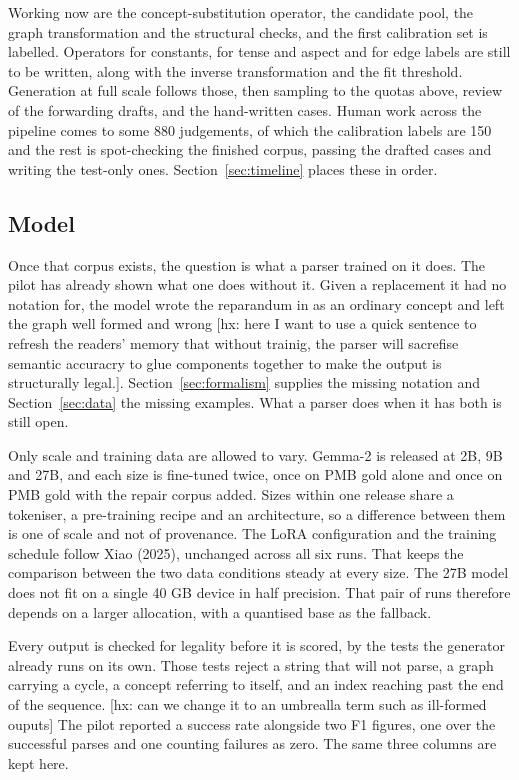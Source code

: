 \documentclass{article}
\begin{document}
Working now are the concept-substitution operator, the candidate pool, the graph
transformation and the structural checks, and the first calibration set is
labelled. Operators for constants, for tense and aspect and for edge labels are
still to be written, along with the inverse transformation and the fit threshold.
Generation at full scale follows those, then sampling to the quotas above, review
of the forwarding drafts, and the hand-written cases. Human work across the
pipeline comes to some 880 judgements, of which the calibration labels are 150 and
the rest is spot-checking the finished corpus, passing the drafted cases and
writing the test-only ones. Section~\ref{sec:timeline} places these in order.


\subsection{Model}
\label{sec:model}

Once that corpus exists, the question is what a parser trained on it does. The
pilot has already shown what one does without it. Given a replacement it had no
notation for, the model wrote the reparandum in as an ordinary concept and left
the graph well formed and wrong [hx: here I want to use a quick sentence to refresh the readers' memory that without trainig, the parser will sacrefise semantic accuracry to glue components together to make the output is structurally legal.]. 
Section~\ref{sec:formalism} supplies the missing
notation and Section~\ref{sec:data} the missing examples. What a parser does when
it has both is still open.

Only scale and training data are allowed to vary. Gemma-2 is released at 2B, 9B
and 27B, and each size is fine-tuned twice, once on PMB gold alone and once on
PMB gold with the repair corpus added. Sizes within one release share a
tokeniser, a pre-training recipe and an architecture, so a difference between
them is one of scale and not of provenance. The LoRA configuration and the
training schedule follow Xiao (2025), unchanged across all six runs. That keeps
the comparison between the two data conditions steady at every size. The 27B
model does not fit on a single 40 GB device in half precision. That pair of runs
therefore depends on a larger allocation, with a quantised base as the fallback.

Every output is checked for legality before it is scored, by the tests the
generator already runs on its own. Those tests reject a string that will not
parse, a graph carrying a cycle, a concept referring to itself, and an index
reaching past the end of the sequence. [hx: can we change it to an umbrealla term such as ill-formed ouputs] The pilot reported a success rate alongside two F1
figures, one over the successful parses and one counting failures as zero. The
same three columns are kept here.
\end{document}
